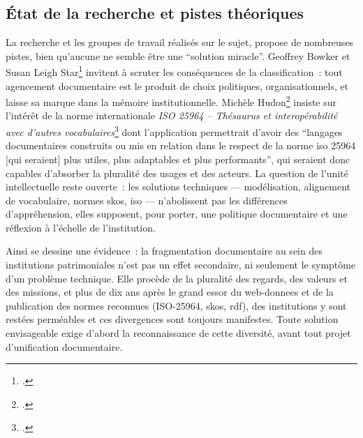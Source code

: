 \subsection{État de la recherche et pistes théoriques}

La recherche et les groupes de travail réalisés sur le sujet, propose de nombreuses pistes, bien qu'aucune ne semble être une \enquote{solution miracle}. Geoffrey Bowker et Susan Leigh Star\footcite{bowkerArrangerChosesConsequences2023} invitent à scruter les conséquences de la classification~: tout agencement documentaire est le produit de choix politiques, organisationnels, et laisse sa marque dans la mémoire institutionnelle. Michèle Hudon\footcite{hudonISO25964Pour2012a} insiste sur l'intérêt de la norme internationale \textit{ISO 25964 -- Thésaurus et interopérabilité avec d'autres vocabulaires}\footcite{ISO25964120112011} dont l'application permettrait d'avoir des \enquote{langages documentaires construits ou mis en relation dans le respect de la norme \gls{iso} 25964 [qui seraient] plus utiles, plus adaptables et plus performants}, qui seraient donc capables d’absorber la pluralité des usages et des acteurs. La question de l’unité intellectuelle reste ouverte~: les solutions techniques — modélisation, alignement de vocabulaire, normes \gls{skos}, \gls{iso} — n’abolissent pas les différences d’appréhension, elles supposent, pour porter, une politique documentaire et une réflexion à l'échelle de l'institution.

\bigskip
\bigskip
\bigskip


Ainsi se dessine une évidence~: la fragmentation documentaire au sein des institutions patrimoniales n’est pas un effet secondaire, ni seulement le symptôme d’un problème technique. Elle procède de la pluralité des regards, des valeurs et des missions, et plus de dix ans après le grand essor du \gls{web-donnees} et de la publication des normes reconnues (ISO-25964, \gls{skos}, \gls{rdf}), des institutions y sont restées perméables et ces divergences sont toujours manifestes. Toute solution envisageable exige d’abord la reconnaissance de cette diversité, avant tout projet d’unification documentaire.